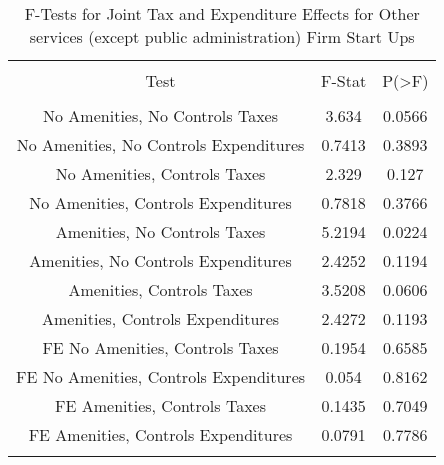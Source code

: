 
\begin{table}[!htbp] \centering 
  \caption{F-Tests for Joint Tax and Expenditure Effects for Other services (except public administration) Firm Start Ups} 
  \label{81Ftests} 
\begin{tabular}{@{\extracolsep{5pt}} ccc} 
\\[-1.8ex]\hline 
\hline \\[-1.8ex] 
Test & F-Stat & P(\textgreater F) \\ 
\hline \\[-1.8ex] 
No Amenities, No Controls Taxes & 3.634 & 0.0566 \\ 
No Amenities, No Controls Expenditures & 0.7413 & 0.3893 \\ 
No Amenities, Controls Taxes & 2.329 & 0.127 \\ 
No Amenities, Controls Expenditures & 0.7818 & 0.3766 \\ 
Amenities, No Controls Taxes & 5.2194 & 0.0224 \\ 
Amenities, No Controls Expenditures & 2.4252 & 0.1194 \\ 
Amenities, Controls Taxes & 3.5208 & 0.0606 \\ 
Amenities, Controls Expenditures & 2.4272 & 0.1193 \\ 
FE No Amenities, Controls Taxes & 0.1954 & 0.6585 \\ 
FE No Amenities, Controls Expenditures & 0.054 & 0.8162 \\ 
FE Amenities, Controls Taxes & 0.1435 & 0.7049 \\ 
FE Amenities, Controls Expenditures & 0.0791 & 0.7786 \\ 
\hline \\[-1.8ex] 
\end{tabular} 
\end{table} 
